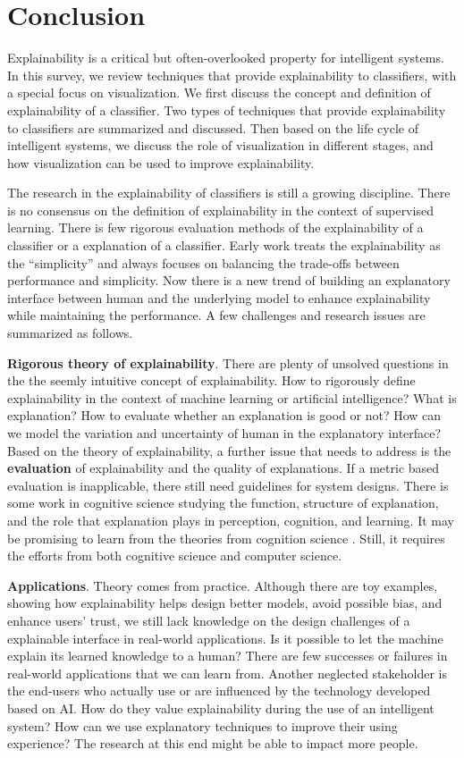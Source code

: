 \chapter{Conclusion}\label{sec-conclusion}

Explainability is a critical but often-overlooked property for intelligent systems. In this survey, we review techniques that provide explainability to classifiers, with a special focus on visualization. We first discuss the concept and definition of explainability of a classifier. Two types of techniques that provide explainability to classifiers are summarized and discussed. Then based on the life cycle of intelligent systems, we discuss the role of visualization in different stages, and how visualization can be used to improve explainability.

The research in the explainability of classifiers is still a growing discipline. There is no consensus on the definition of explainability in the context of supervised learning. There is few rigorous evaluation methods of the explainability of a classifier or a explanation of a classifier. Early work treats the explainability as the ``simplicity'' and always focuses on balancing the trade-offs between performance and simplicity. Now there is a new trend of building an explanatory interface between human and the underlying model to enhance explainability while maintaining the performance. A few challenges and research issues are summarized as follows.

\textbf{Rigorous theory of explainability}. There are plenty of unsolved questions in the the seemly intuitive concept of explainability. How to rigorously define explainability in the context of machine learning or artificial intelligence? What is explanation? How to evaluate whether an explanation is good or not? How can we model the variation and uncertainty of human in the explanatory interface? Based on the theory of explainability, a further issue that needs to address is the \textbf{evaluation} of explainability and the quality of explanations. If a metric based evaluation is inapplicable, there still need guidelines for system designs. There is some work in cognitive science studying the function, structure of explanation, and the role that explanation plays in perception, cognition, and learning. It may be promising to learn from the theories from cognition science \cite{ritter2017cognitive}. Still, it requires the efforts from both cognitive science and computer science.

\textbf{Applications}. Theory comes from practice. Although there are toy examples, showing how explainability helps design better models, avoid possible bias, and enhance users' trust, we still lack knowledge on the design challenges of a explainable interface in real-world applications. Is it possible to let the machine explain its learned knowledge to a human? There are few successes or failures in real-world applications that we can learn from. Another neglected stakeholder is the end-users who actually use or are influenced by the technology developed based on AI. How do they value explainability during the use of an intelligent system? How can we use explanatory techniques to improve their using experience? The research at this end might be able to impact more people.

